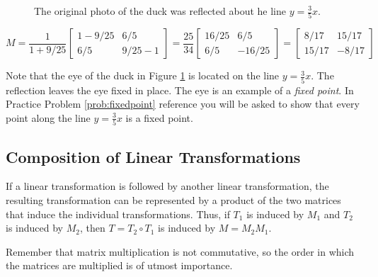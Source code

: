 \documentclass{ximera}
\newcommand{\RR}{\mathbb{R}}
\newcommand{\dfn}{\textit}
\begin{document}
\begin{example}
\begin{figure}[h]
\begin{tikzpicture}[scale=2]
 \end{tikzpicture}
 \caption{The original photo of the duck was reflected about he line $y=\frac{3}{5}x$.}
  \label{fig:reflectedduck} 
\end{figure}
\begin{explanation}
$$M=\frac{1}{1+9/25}\begin{bmatrix}1-9/25 & 6/5\\6/5 & 9/25 -1\end{bmatrix}=\frac{25}{34}\begin{bmatrix}16/25 & 6/5\\6/5 & -16/25\end{bmatrix}=\begin{bmatrix}8/17 & 15/17\\15/17 & -8/17\end{bmatrix}$$
\end{explanation}
\end{example}

Note that the eye of the duck in Figure \ref{fig:reflectedduck} is located on the line $y=\frac{3}{5}x$.  The reflection leaves the eye fixed in place.  The eye is an example of a \dfn{fixed point}.  In Practice Problem \ref{prob:fixedpoint} {\color{red} reference} you will be asked to show that every point along the line $y=\frac{3}{5}x$ is a fixed point.

\subsection*{Composition of Linear Transformations}

If a linear transformation is followed by another linear transformation, the resulting transformation can be represented by a product of the two matrices that induce the individual transformations.  Thus, if $T_1$ is induced by $M_1$ and $T_2$ is induced by $M_2$, then $T=T_2\circ T_1$ is induced by $M=M_2M_1$.

\begin{center}
\end{center}

Remember that matrix multiplication is not commutative, so the order in which the matrices are multiplied is of utmost importance.
\end{document}
